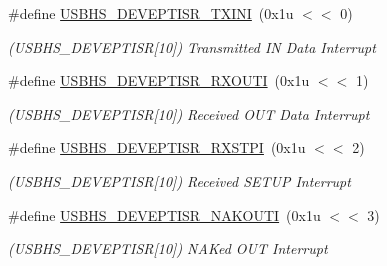 \begin{DoxyCompactItemize}
\mbox{\label{group__SAME70__USBHS_ga90f3eb46b67012a13277f7fa34a433d9}} 
\#define \mbox{\hyperlink{group__SAME70__USBHS_ga90f3eb46b67012a13277f7fa34a433d9}{U\+S\+B\+H\+S\+\_\+\+D\+E\+V\+E\+P\+T\+I\+S\+R\+\_\+\+T\+X\+I\+NI}}~(0x1u $<$$<$ 0)
\begin{DoxyCompactList}\small\item\em (U\+S\+B\+H\+S\+\_\+\+D\+E\+V\+E\+P\+T\+I\+SR\mbox{[}10\mbox{]}) Transmitted IN Data Interrupt \end{DoxyCompactList}\item 
\mbox{\label{group__SAME70__USBHS_ga0cb192d6efb653c28e962175c389896a}} 
\#define \mbox{\hyperlink{group__SAME70__USBHS_ga0cb192d6efb653c28e962175c389896a}{U\+S\+B\+H\+S\+\_\+\+D\+E\+V\+E\+P\+T\+I\+S\+R\+\_\+\+R\+X\+O\+U\+TI}}~(0x1u $<$$<$ 1)
\begin{DoxyCompactList}\small\item\em (U\+S\+B\+H\+S\+\_\+\+D\+E\+V\+E\+P\+T\+I\+SR\mbox{[}10\mbox{]}) Received O\+UT Data Interrupt \end{DoxyCompactList}\item 
\mbox{\label{group__SAME70__USBHS_ga612669600cec1778ab5e97f869aee53b}} 
\#define \mbox{\hyperlink{group__SAME70__USBHS_ga612669600cec1778ab5e97f869aee53b}{U\+S\+B\+H\+S\+\_\+\+D\+E\+V\+E\+P\+T\+I\+S\+R\+\_\+\+R\+X\+S\+T\+PI}}~(0x1u $<$$<$ 2)
\begin{DoxyCompactList}\small\item\em (U\+S\+B\+H\+S\+\_\+\+D\+E\+V\+E\+P\+T\+I\+SR\mbox{[}10\mbox{]}) Received S\+E\+T\+UP Interrupt \end{DoxyCompactList}\item 
\mbox{\label{group__SAME70__USBHS_gae9b85a13a7b3e767ea4ff4480ffc4aa4}} 
\#define \mbox{\hyperlink{group__SAME70__USBHS_gae9b85a13a7b3e767ea4ff4480ffc4aa4}{U\+S\+B\+H\+S\+\_\+\+D\+E\+V\+E\+P\+T\+I\+S\+R\+\_\+\+N\+A\+K\+O\+U\+TI}}~(0x1u $<$$<$ 3)
\begin{DoxyCompactList}\small\item\em (U\+S\+B\+H\+S\+\_\+\+D\+E\+V\+E\+P\+T\+I\+SR\mbox{[}10\mbox{]}) N\+A\+Ked O\+UT Interrupt \end{DoxyCompactList}\item 
\mbox{\label{group__SAME70__USBHS_ga529fa6ed28b70b37d2fe4ab6e84f172a}} 

\end{DoxyCompactItemize}
